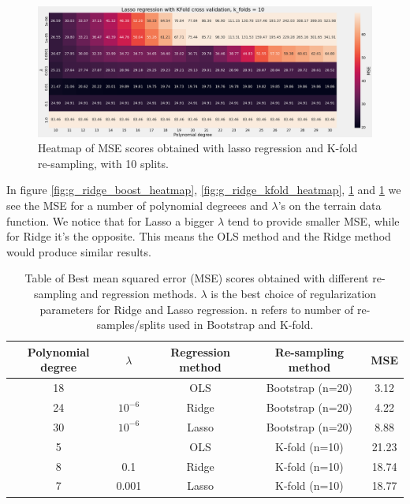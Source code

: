 \begin{figure}[H]
    \centering
    \includegraphics[width=\textwidth]{Figures/g_lasso_heatmap_kfold_n_10.png}
    \caption{Heatmap of MSE scores obtained with lasso regression and K-fold
    re-sampling, with 10 splits.}  
    \label{fig:g_lasso_boots_heatmap}  
\end{figure}

In figure \ref{fig:g_ridge_boost_heatmap}, \ref{fig:g_ridge_kfold_heatmap}, \ref{fig:g_lasso_boots_heatmap} and \ref{fig:g_lasso_boots_heatmap} we see the MSE for a number of polynomial degreees and $\lambda$'s on the terrain data function. We notice that for Lasso a bigger $\lambda$ tend to provide smaller MSE, while for Ridge it's the opposite. This means the OLS method and the Ridge method would produce similar results. 

\begin{table}
    \centering
    \caption{Table of Best mean squared error (MSE) scores obtained with
        different re-sampling and regression
        methods. $\lambda $ is the best choice of regularization parameters for
        Ridge and Lasso regression. n refers to number of re-samples/splits used in
        Bootstrap and K-fold.}  
    \label{tab:terrain_mse_best} 
    \begin{tabular}{|c|c|c|c|c|}
        \hline
        Polynomial degree & $\lambda$ & Regression method & Re-sampling method & MSE \\
        \hline
                          18 &   &  OLS & Bootstrap (n=20) & 3.12\\
        \hline

                          24 & $10^{-6}$ &   Ridge & Bootstrap (n=20) & 4.22\\
        \hline

                          30 &  $10^{-6}$ & Lasso&  Bootstrap (n=20) & 8.88\\
        \hline

                          5 &  & OLS & K-fold (n=10)& 21.23\\
        \hline

                          8 &  0.1 & Ridge & K-fold (n=10)& 18.74\\ %
        \hline
                          7 & 0.001 &  Lasso & K-fold (n=10)& 18.77\\ %
        \hline
    \end{tabular} 
\end{table}

